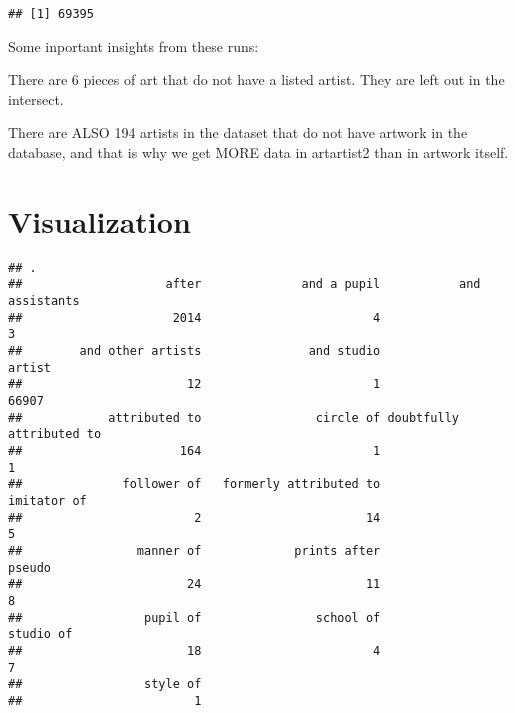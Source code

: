 \documentclass[]{article}
\newenvironment{Shaded}{\begin{snugshade}}{\end{snugshade}}
\newcommand{\CommentTok}[1]{\textcolor[rgb]{0.56,0.35,0.01}{\textit{#1}}}
\newcommand{\DataTypeTok}[1]{\textcolor[rgb]{0.13,0.29,0.53}{#1}}
\newcommand{\DecValTok}[1]{\textcolor[rgb]{0.00,0.00,0.81}{#1}}
\newcommand{\KeywordTok}[1]{\textcolor[rgb]{0.13,0.29,0.53}{\textbf{#1}}}
\newcommand{\NormalTok}[1]{#1}
\newcommand{\OperatorTok}[1]{\textcolor[rgb]{0.81,0.36,0.00}{\textbf{#1}}}
\newcommand{\StringTok}[1]{\textcolor[rgb]{0.31,0.60,0.02}{#1}}
\begin{document}
\begin{verbatim}
## [1] 69395
\end{verbatim}

Some inportant insights from these runs:

There are 6 pieces of art that do not have a listed artist. They are
left out in the intersect.

There are ALSO 194 artists in the dataset that do not have artwork in
the database, and that is why we get MORE data in artartist2 than in
artwork itself.

\hypertarget{visualization}{%
\section{Visualization}\label{visualization}}

\begin{Shaded}
\end{Shaded}

\begin{verbatim}
## .
##                    after              and a pupil           and assistants 
##                     2014                        4                        3 
##        and other artists               and studio                   artist 
##                       12                        1                    66907 
##            attributed to                circle of doubtfully attributed to 
##                      164                        1                        1 
##              follower of   formerly attributed to              imitator of 
##                        2                       14                        5 
##                manner of             prints after                   pseudo 
##                       24                       11                        8 
##                 pupil of                school of                studio of 
##                       18                        4                        7 
##                 style of 
##                        1
\end{verbatim}

\begin{Shaded}
\end{Shaded}
\end{document}
